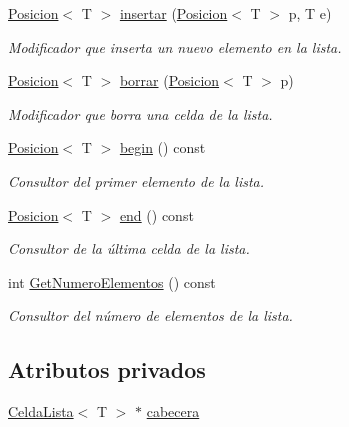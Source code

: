 \begin{DoxyCompactItemize}
\mbox{\hyperlink{classPosicion}{Posicion}}$<$ T $>$ \mbox{\hyperlink{classLista_a3ecb3ea6a48f28863bfb99c2f3d59a9d}{insertar}} (\mbox{\hyperlink{classPosicion}{Posicion}}$<$ T $>$ p, T e)
\begin{DoxyCompactList}\small\item\em Modificador que inserta un nuevo elemento en la lista. \end{DoxyCompactList}\item 
\mbox{\hyperlink{classPosicion}{Posicion}}$<$ T $>$ \mbox{\hyperlink{classLista_a65536b824c9cd33570fab5a98ad536fb}{borrar}} (\mbox{\hyperlink{classPosicion}{Posicion}}$<$ T $>$ p)
\begin{DoxyCompactList}\small\item\em Modificador que borra una celda de la lista. \end{DoxyCompactList}\item 
\mbox{\hyperlink{classPosicion}{Posicion}}$<$ T $>$ \mbox{\hyperlink{classLista_af73b5f5eb9e67ae9d1346f045d648d0c}{begin}} () const
\begin{DoxyCompactList}\small\item\em Consultor del primer elemento de la lista. \end{DoxyCompactList}\item 
\mbox{\hyperlink{classPosicion}{Posicion}}$<$ T $>$ \mbox{\hyperlink{classLista_ae88b437349a0e87803d4453946e21f97}{end}} () const
\begin{DoxyCompactList}\small\item\em Consultor de la última celda de la lista. \end{DoxyCompactList}\item 
int \mbox{\hyperlink{classLista_a59dba3aa3e7c54996e33e5c8c6dabfa2}{Get\+Numero\+Elementos}} () const
\begin{DoxyCompactList}\small\item\em Consultor del número de elementos de la lista. \end{DoxyCompactList}\end{DoxyCompactItemize}
\subsection*{Atributos privados}
\begin{DoxyCompactItemize}
\item 
\mbox{\hyperlink{structCeldaLista}{Celda\+Lista}}$<$ T $>$ $\ast$ \mbox{\hyperlink{classLista_a2d0dd8c80abfa1bee249300e2f903f03}{cabecera}}
\end{DoxyCompactItemize}


